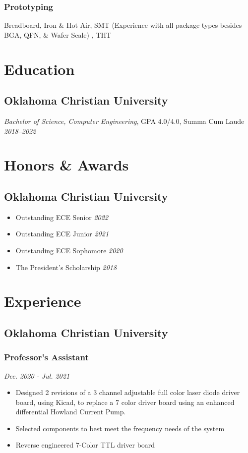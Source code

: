 \documentclass{article}
\begin{document}
\begin{spacing}{.5}
		\subsubsection{Prototyping} \small{Breadboard, Iron \& Hot Air, SMT} \scriptsize{(Experience with all package types besides BGA, QFN, \& Wafer Scale)} \small{, THT}

\section{Education}
	\subsection{Oklahoma Christian University}
		\textit{Bachelor of Science, Computer Engineering}, GPA 4.0/4.0, Summa Cum Laude \hfill \scriptsize{\textsl{2018--2022}}

\section{Honors \& Awards}
	\subsection{Oklahoma Christian University}
		\begin{itemize}[label=$\bullet$,itemsep=-.75ex]
			\item \small{Outstanding ECE Senior} \hfill \scriptsize{\textsl{2022}}
			\item \small{Outstanding ECE Junior} \hfill \scriptsize{\textsl{2021}}
			\item \small{Outstanding ECE Sophomore} \hfill \scriptsize{\textsl{2020}}
			\item \small{The President's Scholarship} \hfill \scriptsize{\textsl{2018}}
		\end{itemize}
\section{Experience}
	\subsection{Oklahoma Christian University}
		\subsubsection{\small{Professor's Assistant}} \hfill \scriptsize{\textsl{Dec. 2020 - Jul. 2021}}
			\begin{itemize}[label=--,itemsep=-.75ex]
				\item \small{Designed 2 revisions of a 3 channel adjustable full color laser diode driver board, using Kicad, to replace a 7 color driver board using an enhanced differential Howland Current Pump.}
				\item \small{Selected components to best meet the frequency needs of the system}
				\item \small{Reverse engineered 7-Color TTL driver board}
			\end{itemize}

\end{spacing}
\end{document}
